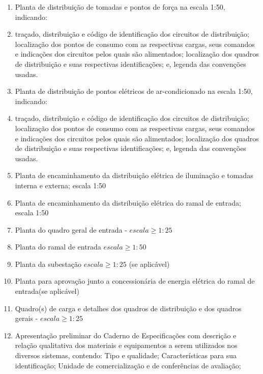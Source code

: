 \begin{enumerate}
		\item Planta de distribuição de tomadas e pontos de força na escala 1:50, indicando: 
		\item traçado, distribuição e código de identificação dos circuitos de distribuição; localização dos pontos de consumo com as respectivas cargas, seus comandos e indicações dos circuitos pelos quais são alimentados; localização dos quadros de distribuição e suas respectivas identificações; e, legenda das convenções usadas.
		\item Planta de distribuição de pontos elétricos de ar-condicionado na escala 1:50, indicando: 
		\item traçado, distribuição e código de identificação dos circuitos de distribuição; localização dos pontos de consumo com as respectivas cargas, seus comandos e indicações dos circuitos pelos quais são alimentados; localização dos quadros de distribuição e suas respectivas identificações; e, legenda das convenções usadas.
		\item Planta de encaminhamento da distribuição elétrica de iluminação e tomadas interna e externa; escala 1:50
		\item Planta de encaminhamento da distribuição elétrica do ramal de entrada; escala 1:50
		\item Planta do quadro geral de entrada - $escala \geq 1:25$
		\item Planta do ramal de entrada $escala \geq 1:50$
		\item Planta da subestação $escala \geq 1:25 $ (se aplicável)
		\item Planta para aprovação junto a concessionária de energia elétrica do ramal de entrada(se aplicável)
		\item Quadro(s) de carga e detalhes dos quadros de distribuição e dos quadros gerais - $escala \geq 1:25$
		\item Apresentação preliminar do Caderno de Especificações com descrição e relação qualitativa dos materiais e equipamentos a serem utilizados nos diversos sistemas, contendo: Tipo e qualidade; Características para sua identificação; Unidade de comercialização e de conferências de avaliação;
	\end{enumerate}
